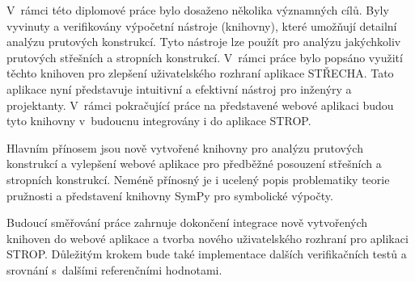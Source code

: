 V~rámci této diplomové práce bylo dosaženo několika významných cílů. Byly vyvinuty a verifikovány výpočetní nástroje (knihovny), které umožňují detailní analýzu prutových konstrukcí. Tyto nástroje lze použít pro analýzu jakýchkoliv prutových střešních a stropních konstrukcí. V~rámci práce bylo popsáno využití těchto knihoven pro zlepšení uživatelského rozhraní aplikace STŘECHA. Tato aplikace nyní představuje intuitivní a efektivní nástroj pro inženýry a projektanty. V~rámci pokračující práce na představené webové aplikaci budou tyto knihovny v~budoucnu integrovány i do aplikace STROP.

Hlavním přínosem jsou nově vytvořené knihovny pro analýzu prutových konstrukcí a vylepšení webové aplikace pro předběžné posouzení střešních a stropních konstrukcí. Neméně přínosný je i ucelený popis problematiky teorie pružnosti a představení knihovny SymPy pro symbolické výpočty.

Budoucí směřování práce zahrnuje dokončení integrace nově vytvořených knihoven do webové aplikace a tvorba nového uživatelského
rozhraní pro aplikaci STROP. Důležitým krokem bude také implementace dalších verifikačních testů a srovnání s~dalšími referenčními hodnotami.